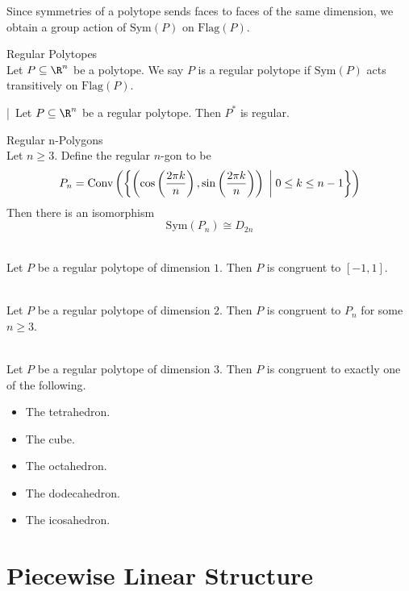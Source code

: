 \documentclass[a4paper]{article}
\begin{document}
Since symmetries of a polytope sends faces to faces of the same dimension, we obtain a group action of $\text{Sym}(P)$ on $\text{Flag}(P)$. 

\begin{defn}{Regular Polytopes}{}\\
Let $P\subseteq\R^n$ be a polytope. We say $P$ is a regular polytope if $\text{Sym}(P)$ acts transitively on $\text{Flag}(P)$. 
\end{defn}

\begin{lmm}{}{}|\
Let $P\subseteq\R^n$ be a regular polytope. Then $P^\ast$ is regular. 
\end{lmm}

\begin{eg}{Regular n-Polygons}{}\\
Let $n\geq 3$. Define the regular $n$-gon to be $$P_n=\text{Conv}\left(\left\{\left(\cos\left(\frac{2\pi k}{n}\right),\sin\left(\frac{2\pi k}{n}\right)\right)\;\bigg{|}\;0\leq k\leq n-1\right\}\right)$$ Then there is an isomorphism $$\text{Sym}(P_n)\cong D_{2n}$$
\end{eg}

\begin{prp}{}{}\\
Let $P$ be a regular polytope of dimension $1$. Then $P$ is congruent to $[-1,1]$. 
\end{prp}

\begin{prp}{}{}\\
Let $P$ be a regular polytope of dimension $2$. Then $P$ is congruent to $P_n$ for some $n\geq 3$. 
\end{prp}

\begin{prp}{}{}\\
Let $P$ be a regular polytope of dimension $3$. Then $P$ is congruent to exactly one of the following. 
\begin{itemize}
\item The tetrahedron. 
\item The cube. 
\item The octahedron. 
\item The dodecahedron. 
\item The icosahedron. 
\end{itemize}
\end{prp}

\pagebreak
\section{Piecewise Linear Structure}
\end{document}
